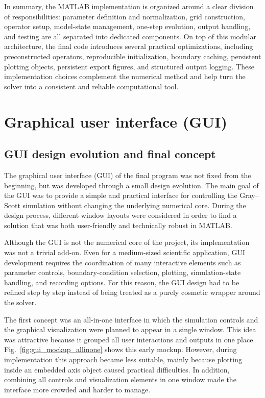 In summary, the MATLAB implementation is organized around a clear division of responsibilities: parameter definition and normalization, grid construction, operator setup, model-state management, one-step evolution, output handling, and testing are all separated into dedicated components. On top of this modular architecture, the final code introduces several practical optimizations, including preconstructed operators, reproducible initialization, boundary caching, persistent plotting objects, persistent export figures, and structured output logging. These implementation choices complement the numerical method and help turn the solver into a consistent and reliable computational tool.

\section{Graphical user interface (GUI)}
\label{sec:gui}

\subsection{GUI design evolution and final concept}
\label{subsec:gui_evolution}

The graphical user interface (GUI) of the final program was not fixed from the beginning, but was developed through a small design evolution. The main goal of the GUI was to provide a simple and practical interface for controlling the Gray--Scott simulation without changing the underlying numerical core. During the design process, different window layouts were considered in order to find a solution that was both user-friendly and technically robust in MATLAB.

Although the GUI is not the numerical core of the project, its implementation was not a trivial add-on. Even for a medium-sized scientific application, GUI development requires the coordination of many interactive elements such as parameter controls, boundary-condition selection, plotting, simulation-state handling, and recording options. For this reason, the GUI design had to be refined step by step instead of being treated as a purely cosmetic wrapper around the solver.

The first concept was an all-in-one interface in which the simulation controls and the graphical visualization were planned to appear in a single window. This idea was attractive because it grouped all user interactions and outputs in one place. Fig.~\ref{fig:gui_mockup_allinone} shows this early mockup. However, during implementation this approach became less suitable, mainly because plotting inside an embedded axis object caused practical difficulties. In addition, combining all controls and visualization elements in one window made the interface more crowded and harder to manage.

